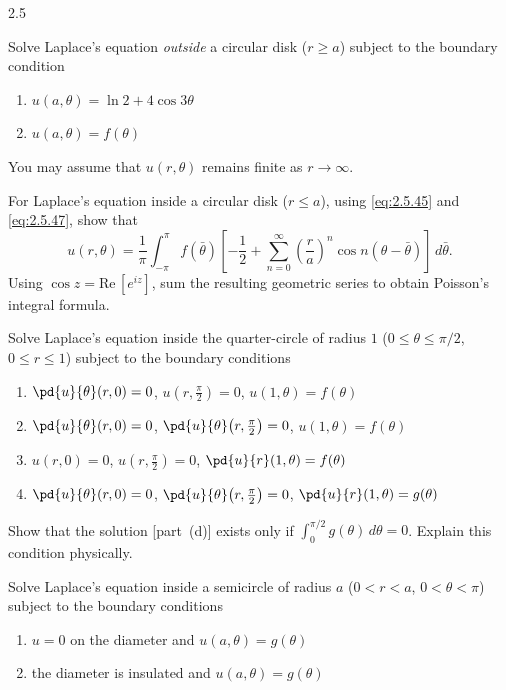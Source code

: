 \begin{exercises}{2.5}
\item\starred{} Solve Laplace's equation \emph{outside} a circular disk ($r \ge a$) subject to the boundary condition
\begin{enumerate}
\item[(a)] $u(a,\theta) = \ln 2 + 4\cos 3\theta$
\item[(b)] $u(a,\theta) = f(\theta)$
\end{enumerate}
You may assume that $u(r,\theta)$ remains finite as $r \to \infty$.

\item\starred{} For Laplace's equation inside a circular disk ($r \le a$), using \eqref{eq:2.5.45} and \eqref{eq:2.5.47}, show that
\[
u(r,\theta) = \frac{1}{\pi}\int_{-\pi}^{\pi} f(\bar\theta)\left[-\frac{1}{2} + \sum_{n=0}^{\infty}\left(\frac{r}{a}\right)^n \cos n(\theta - \bar\theta)\right]\,d\bar\theta.
\]
Using $\cos z = \text{Re}\,[e^{iz}]$, sum the resulting geometric series to obtain Poisson's integral formula.

\item Solve Laplace's equation inside the quarter-circle of radius $1$ ($0 \le \theta \le \pi/2$, $0 \le r \le 1$) subject to the boundary conditions
\begin{enumerate}
\item[\starred(a)] $\pd{u}{\theta}(r,0) = 0$, \quad $u\!\left(r,\frac{\pi}{2}\right) = 0$, \quad $u(1,\theta) = f(\theta)$
\item[(b)] $\pd{u}{\theta}(r,0) = 0$, \quad $\pd{u}{\theta}\!\left(r,\frac{\pi}{2}\right) = 0$, \quad $u(1,\theta) = f(\theta)$
\item[\starred(c)] $u(r,0) = 0$, \quad $u\!\left(r,\frac{\pi}{2}\right) = 0$, \quad $\pd{u}{r}(1,\theta) = f(\theta)$
\item[(d)] $\pd{u}{\theta}(r,0) = 0$, \quad $\pd{u}{\theta}\!\left(r,\frac{\pi}{2}\right) = 0$, \quad $\pd{u}{r}(1,\theta) = g(\theta)$
\end{enumerate}
Show that the solution [part~(d)] exists only if $\int_0^{\pi/2} g(\theta)\,d\theta = 0$. Explain this condition physically.

\item Solve Laplace's equation inside a semicircle of radius $a$ ($0 < r < a$, $0 < \theta < \pi$) subject to the boundary conditions
\begin{enumerate}
\item[\starred(a)] $u = 0$ on the diameter and $u(a,\theta) = g(\theta)$
\item[(b)] the diameter is insulated and $u(a,\theta) = g(\theta)$
\end{enumerate}


\end{exercises}
